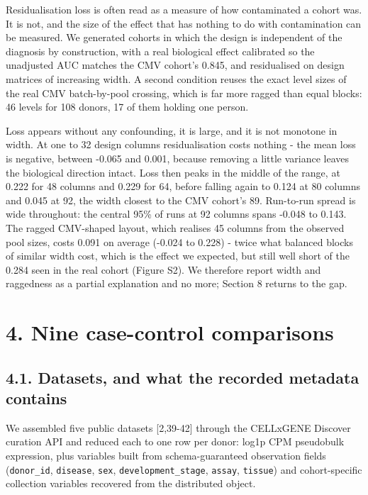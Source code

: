 Residualisation loss is often read as a measure of how contaminated a cohort was. It is not, and the size of the effect that has nothing to do with contamination can be measured. We generated cohorts in which the design is independent of the diagnosis by construction, with a real biological effect calibrated so the unadjusted AUC matches the CMV cohort's 0.845, and residualised on design matrices of increasing width. A second condition reuses the exact level sizes of the real CMV batch-by-pool crossing, which is far more ragged than equal blocks: 46 levels for 108 donors, 17 of them holding one person.

Loss appears without any confounding, it is large, and it is not monotone in width. At one to 32 design columns residualisation costs nothing - the mean loss is negative, between -0.065 and 0.001, because removing a little variance leaves the biological direction intact. Loss then peaks in the middle of the range, at 0.222 for 48 columns and 0.229 for 64, before falling again to 0.124 at 80 columns and 0.045 at 92, the width closest to the CMV cohort's 89. Run-to-run spread is wide throughout: the central 95\% of runs at 92 columns spans -0.048 to 0.143. The ragged CMV-shaped layout, which realises 45 columns from the observed pool sizes, costs 0.091 on average (-0.024 to 0.228) - twice what balanced blocks of similar width cost, which is the effect we expected, but still well short of the 0.284 seen in the real cohort (Figure S2). We therefore report width and raggedness as a partial explanation and no more; Section 8 returns to the gap.

\section{4. Nine case-control comparisons}\label{nine-case-control-comparisons}

\subsection{4.1. Datasets, and what the recorded metadata contains}\label{datasets-and-what-the-recorded-metadata-contains}

We assembled five public datasets {[}2,39-42{]} through the CELLxGENE Discover curation API and reduced each to one row per donor: log1p CPM pseudobulk expression, plus variables built from schema-guaranteed observation fields (\texttt{donor\_id}, \texttt{disease}, \texttt{sex}, \texttt{development\_stage}, \texttt{assay}, \texttt{tissue}) and cohort-specific collection variables recovered from the distributed object.

